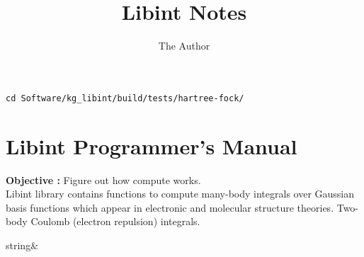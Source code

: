\documentclass[11pt, oneside]{article}   	%
\title{Libint Notes}
\author{The Author}
\begin{document}
\maketitle
\begin{lstlisting}
cd Software/kg_libint/build/tests/hartree-fock/
\end{lstlisting}
\section{Libint Programmer's Manual}
\textbf{Objective :} Figure out how compute works.\\
Libint library contains functions to compute many-body integrals over Gaussian basis functions which appear in electronic and molecular structure theories. Two-body Coulomb (electron repulsion) integrals.
\begin{todolist}
	\item string&
\end{todolist}
\end{document}
